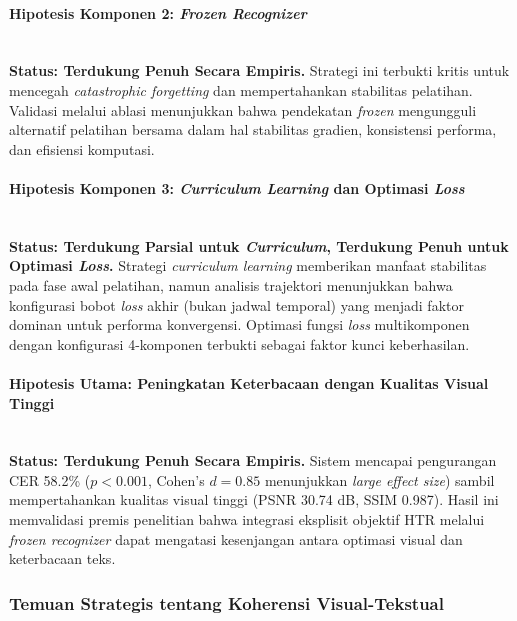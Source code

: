 \documentclass[12pt,a4paper]{article}
\begin{document}
\paragraph{Hipotesis Komponen 2: \textit{Frozen Recognizer}} \mbox{}\\[0.1em]
\textbf{Status: Terdukung Penuh Secara Empiris.} Strategi ini terbukti kritis untuk mencegah \textit{catastrophic forgetting} dan mempertahankan stabilitas pelatihan. Validasi melalui ablasi menunjukkan bahwa pendekatan \textit{frozen} mengungguli alternatif pelatihan bersama dalam hal stabilitas gradien, konsistensi performa, dan efisiensi komputasi.

\paragraph{Hipotesis Komponen 3: \textit{Curriculum Learning} dan Optimasi \textit{Loss}} \mbox{}\\[0.1em]
\textbf{Status: Terdukung Parsial untuk \textit{Curriculum}, Terdukung Penuh untuk Optimasi \textit{Loss}.} Strategi \textit{curriculum learning} memberikan manfaat stabilitas pada fase awal pelatihan, namun analisis trajektori menunjukkan bahwa konfigurasi bobot \textit{loss} akhir (bukan jadwal temporal) yang menjadi faktor dominan untuk performa konvergensi. Optimasi fungsi \textit{loss} multikomponen dengan konfigurasi 4-komponen terbukti sebagai faktor kunci keberhasilan.

\paragraph{Hipotesis Utama: Peningkatan Keterbacaan dengan Kualitas Visual Tinggi} \mbox{}\\[0.1em]
\textbf{Status: Terdukung Penuh Secara Empiris.} Sistem mencapai pengurangan CER 58.2\% ($p<0.001$, Cohen's $d=0.85$ menunjukkan \textit{large effect size}) sambil mempertahankan kualitas visual tinggi (PSNR 30.74 dB, SSIM 0.987). Hasil ini memvalidasi premis penelitian bahwa integrasi eksplisit objektif HTR melalui \textit{frozen recognizer} dapat mengatasi kesenjangan antara optimasi visual dan keterbacaan teks.

\vspace{0.8em}

\subsubsection{Temuan Strategis tentang Koherensi Visual-Tekstual}
\label{subsubsec:koherensi-visual-tekstual}
\end{document}
